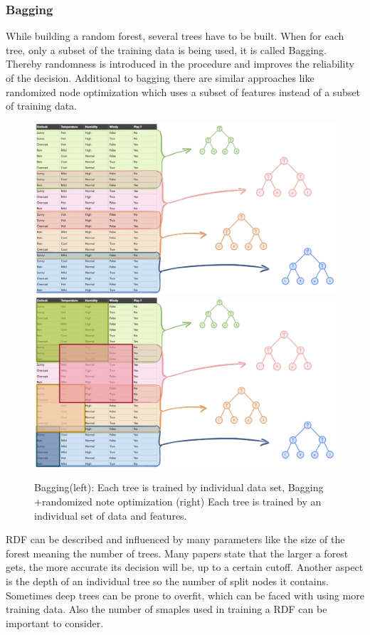 \documentclass[
12pt,
headsepline,
bibliography=totoc,
twoside=semi,
]{scrartcl}
\begin{document}
 \subsubsection{Bagging\label{sec:sec2-2-1}}
 While building a random forest, several trees have to be built. When for each tree, only a subset of the training data is being used, it is called Bagging. Thereby randomness is introduced in the procedure and improves the reliability of the decision. Additional to bagging there are similar approaches like randomized node optimization which uses a subset of features instead of a subset of training data.  
 
 \begin{figure}[H]
 \includegraphics[scale=0.4]{BDT12.png}\label{fig:fig12}
 \includegraphics[scale=0.4]{BDT13.png}\label{fig:fig13}
 \caption{Bagging(left): Each tree is trained by individual data set, Bagging +randomized note optimization (right) Each tree is trained by an individual set of data and features.}

 \end{figure}

RDF can be described and influenced by many parameters like the size of the forest meaning the number of trees. Many papers state that the larger a forest gets, the more accurate its decision will be, up to a certain cutoff. Another aspect is the depth of an individual tree so the number of split nodes it contains. Sometimes deep trees can be prone to overfit, which can be faced with using more training data. Also the number of smaples used in training a RDF can be important to consider.
\end{document}
